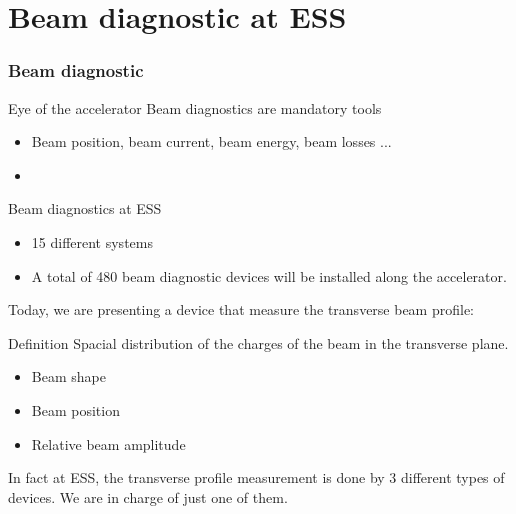 \section{Beam diagnostic at ESS}

\begin{frame}
  \frametitle{Beam diagnostic}
  Eye of the accelerator
  Beam diagnostics are mandatory tools
  \begin{itemize}
    \item Beam position, beam current, beam energy, beam losses ...
    \item
  \end{itemize}

  \begin{block}{Beam diagnostics at ESS}
    \begin{itemize}
      \item 15 different systems
      \item A total of 480 beam diagnostic devices will be installed along the accelerator.
    \end{itemize}
  \end{block}

  Today, we are presenting a device that measure the transverse beam profile:

  \begin{block}{Definition}
    Spacial distribution of the charges of the beam in the transverse plane.
    \begin{itemize}
      \item Beam shape
      \item Beam position
      \item Relative beam amplitude
    \end{itemize}
  \end{block}

  In fact at ESS, the transverse profile measurement is done by 3 different types of devices. We are in charge of just one of them.

\end{frame}

